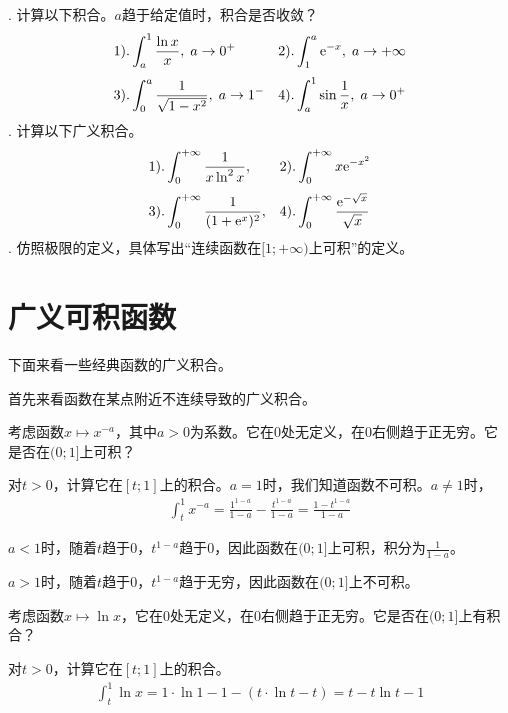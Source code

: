 \documentclass[12pt,UTF8]{ctexbook}
\begin{document}
\begin{xt}
    . 计算以下积合。$a$趋于给定值时，积合是否收敛？\\    
    \begin{align*}
        1).& \int_a^{1} \frac{\ln{x}}{x} , \; a\to 0^+  &2).& \int_1^{a} \mathrm{e}^{-x},  \; a\to +\infty \\[3pt]
        3).& \int_0^{a} \frac{1}{\sqrt{1 - x^2}}, \; a\to 1^-   & 4).& \int_a^{1} \sin{\frac{1}{x}}, \; a\to 0^+ 
    \end{align*}
    . 计算以下广义积合。\\    
    \begin{align*}
        1).& \int_0^{+\infty} \frac{1}{x\ln^2{x}} ,  &2).& \int_0^{+\infty} x\mathrm{e}^{-x^2} \\[3pt]
        3).& \int_0^{+\infty} \frac{1}{(1 + \mathrm{e}^{x})^2},  & 4).& \int_0^{+\infty} \frac{\mathrm{e}^{-\sqrt{x}}}{\sqrt{x}}
    \end{align*}
    . 仿照极限的定义，具体写出“连续函数在$[1;+\infty)$上可积”的定义。\\

\end{xt}

\section{广义可积函数}

下面来看一些经典函数的广义积合。

首先来看函数在某点附近不连续导致的广义积合。

考虑函数$x\mapsto x^{-a}$，其中$a>0$为系数。它在$0$处无定义，在$0$右侧趋于正无穷。它是否在$(0;1]$上可积？

对$t>0$，计算它在$[t;1]$上的积合。$a=1$时，我们知道函数不可积。$a\neq 1$时，
\begin{align*}
    \int_t^1 x^{-a} = \frac{1^{1-a}}{1 - a} - \frac{t^{1-a}}{1 - a} = \frac{1 - t^{1-a}}{1-a} 
\end{align*}

$a<1$时，随着$t$趋于$0$，$t^{1-a}$趋于$0$，因此函数在$(0;1]$上可积，积分为$\frac{1}{1-a}$。

$a>1$时，随着$t$趋于$0$，$t^{1-a}$趋于无穷，因此函数在$(0;1]$上不可积。

考虑函数$x\mapsto \ln{x}$，它在$0$处无定义，在$0$右侧趋于正无穷。它是否在$(0;1]$上有积合？

对$t>0$，计算它在$[t;1]$上的积合。
\begin{align*}
    \int_t^1 \ln{x} = 1\cdot \ln{1} - 1 - (t\cdot\ln{t} - t)= t - t\ln{t} - 1
\end{align*}
\end{document}
